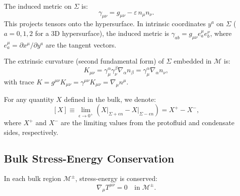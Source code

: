 \begin{definition}
The induced metric on $\Sigma$ is:
\begin{equation}
\label{eq:induced_metric}
\gamma_{\mu\nu} = g_{\mu\nu} - \varepsilon \, n_\mu n_\nu.
\end{equation}
This projects tensors onto the hypersurface. In intrinsic coordinates $y^a$ on $\Sigma$ ($a = 0,1,2$ for a 3D hypersurface), the induced metric is $\gamma_{ab} = g_{\mu\nu} e^\mu_a e^\nu_b$, where $e^\mu_a = \partial x^\mu / \partial y^a$ are the tangent vectors.
\end{definition}

\begin{definition}
The extrinsic curvature (second fundamental form) of $\Sigma$ embedded in $\mathcal{M}$ is:
\begin{equation}
\label{eq:extrinsic_curvature}
K_{\mu\nu} = \gamma^\alpha_\mu \gamma^\beta_\nu \nabla_\alpha n_\beta = \gamma^\alpha_\mu \nabla_\alpha n_\nu,
\end{equation}
with trace $K = g^{\mu\nu} K_{\mu\nu} = \gamma^{\mu\nu} K_{\mu\nu} = \nabla_\mu n^\mu$.
\end{definition}

\begin{definition}
For any quantity $X$ defined in the bulk, we denote:
\begin{equation}
\label{eq:jump_notation}
[X] \equiv \lim_{\epsilon \to 0^+} \left( X\big|_{\Sigma + \epsilon n} - X\big|_{\Sigma - \epsilon n} \right) = X^{+} - X^{-},
\end{equation}
where $X^{+}$ and $X^{-}$ are the limiting values from the protofluid and condensate sides, respectively.
\end{definition}

\subsection{Bulk Stress-Energy Conservation}
\label{app:bulk_conservation}

In each bulk region $\mathcal{M}^{\pm}$, stress-energy is conserved:
\begin{equation}
\label{eq:bulk_conservation}
\nabla_\mu T^{\mu\nu} = 0 \quad \text{in } \mathcal{M}^{\pm}.
\end{equation}

